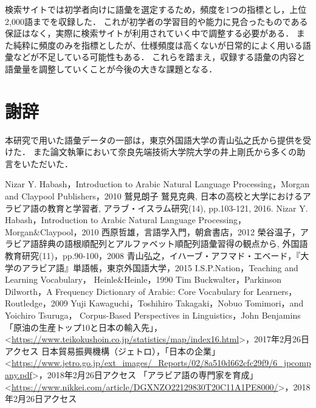\documentclass[technicalreport]{ieicej}
\begin{document}
検索サイトでは初学者向けに語彙を選定するため，頻度を1つの指標とし，上位2,000語までを収録した．
これが初学者の学習目的や能力に見合ったものである保証はなく，実際に検索サイトが利用されていく中で調整する必要がある．
また純粋に頻度のみを指標としたが、仕様頻度は高くないが日常的によく用いる語彙などが不足している可能性もある．
これらを踏まえ，収録する語彙の内容と語彙量を調整していくことが今後の大きな課題となる．

\section{謝辞}
本研究で用いた語彙データの一部は，東京外国語大学の青山弘之氏から提供を受けた．
また論文執筆において奈良先端技術大学院大学の井上剛氏から多くの助言をいただいた．

\begin{thebibliography}{99}
Nizar Y. Habash，Introduction to Arabic Natural Language Processing，Morgan and Claypool Publishers，2010
鷲見朗子 鷲見克典, 日本の高校と大学におけるアラビア語の教育と学習者, アラブ・イスラム研究(14), pp.103-121, 2016.
Nizar Y. Habash，Introduction to Arabic Natural Language Processing，Morgan\&Claypool，2010
西原哲雄，言語学入門，朝倉書店，2012
榮谷温子，アラビア語辞典の語根順配列とアルファベット順配列語彙習得の観点から, 外国語教育研究(11)，pp.90-100，2008
青山弘之，イハーブ・アフマド・エベード，『大学のアラビア語』単語帳，東京外国語大学，2015
I.S.P.Nation，Teaching and Learning Vocabulary， Heinle\&Heinle，1990
Tim Buckwalter，Parkinson Dilworth，A Frequency Dictionary of Arabic: Core Vocabulary for Learners， Routledge，2009
Yuji Kawaguchi，Toshihiro Takagaki，Nobuo Tomimori，and Yoichiro Tsuruga，
Corpus-Based Perspectives in Linguistics，John Benjamins
「原油の生産トップ10と日本の輸入先」， \textless \url{https://www.teikokushoin.co.jp/statistics/map/index16.html}\textgreater，2017年2月26日アクセス
 日本貿易振興機構（ジェトロ），「日本の企業」\textless \url{https://www.jetro.go.jp/ext_images/_Reports/02/8a510d662cfc29f9/6_jpcompany.pdf}\textgreater，2018年2月26日アクセス
「アラビア語の専門家を育成」\textless \url{https://www.nikkei.com/article/DGXNZO22129830T20C11A1PE8000/}\textgreater，2018年2月26日アクセス
\end{thebibliography}
\end{document}

